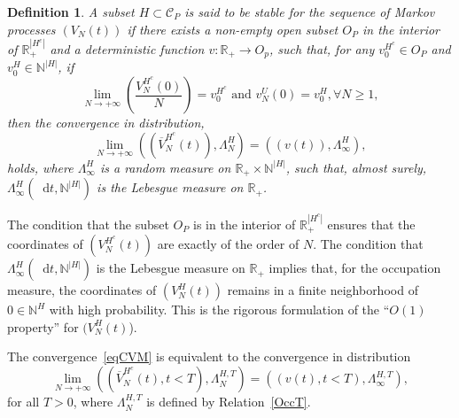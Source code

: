 \documentclass[english]{amsart}
\newcommand{\N}{\ensuremath{\mathbb{N}}}
\newcommand{\R}{\ensuremath{\mathbb{R}}}
\newcommand{\diff}{\mathop{}\mathopen{}\mathrm{d}}
\newcommand{\cal}[1]{\ensuremath{\mathcal{#1}}}
\newtheorem{definition}[proposition]{Definition}
\numberwithin{proposition}{section}
\begin{document}
\begin{definition}\label{Order-Def}
A subset  $H{\subset}{\cal C}_P$  is said to be {\em stable} for the sequence of Markov processes $(V_N(t))$ if  there exists a non-empty open subset $O_P$ in the interior of $\R_+^{|H^c|}$ and a deterministic function $v{:}\R_+{\to}O_p$, such that, for any $v_0^{H^c}{\in}O_P$ and $v^H_0{\in}\N^{|H|}$, if  
\begin{equation}\label{CVIn}
\lim_{N\to+\infty} \left(\frac{V^{H^c}_{N}(0)}{N}\right)=v_0^{H^c}\text{ and } v_N^U(0){=}v^H_0, \forall N{\ge}1,
\end{equation}
then the convergence in distribution, 
\begin{equation}\label{eqCVM}
\lim_{N\to+\infty}  \left(\left(\overline{V}^{H^c}_{N}(t)\right), \Lambda^H_{N}\right)=((v(t)), \Lambda^H_\infty),
\end{equation}
holds, where $\Lambda^H_\infty$ is a random measure on $\R_+{\times}\N^{|H|}$, such that, almost surely,  $\Lambda^H_{\infty}(\diff t, \N^{|H|})$ is the Lebesgue measure on $\R_+$.
\end{definition}

The condition that the subset $O_P$  is in the interior of $\R_+^{|H^c|}$ ensures that the coordinates of $(V_N^{H^c}(t))$ are exactly of the order of $N$. The condition that $\Lambda^H_{\infty}(\diff t, \N^{|H|})$ is the Lebesgue measure on $\R_+$ implies that, for the occupation measure,  the coordinates of  $(V_N^{H}(t))$ remains in a finite neighborhood of $0{\in}\N^H$ with high probability. This is the rigorous formulation of the ``$O(1)$ property'' for $(V_N^{H}(t)$).

The convergence~\eqref{eqCVM} is equivalent to  the convergence in distribution
\begin{equation}\label{eqCVt0}
  \lim_{N\to+\infty}  \left(\left(\overline{V}^{H^c}_{N}(t), t{<}T\right), \Lambda^{H,T}_{N}\right)=((v(t),t{<}T), \Lambda^{H,T}_\infty), 
\end{equation}
for all $T{>}0$, where  $\Lambda^{H,T}_{N}$ is defined by Relation~\eqref{OccT}. 
\end{document}
